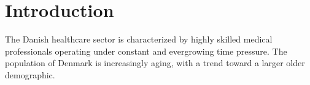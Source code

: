 \section{Introduction}
The Danish healthcare sector is characterized by highly skilled medical professionals operating under constant and evergrowing time pressure. The population of Denmark is increasingly aging, with a trend toward a larger older demographic\cite{dst-older-pop}.

